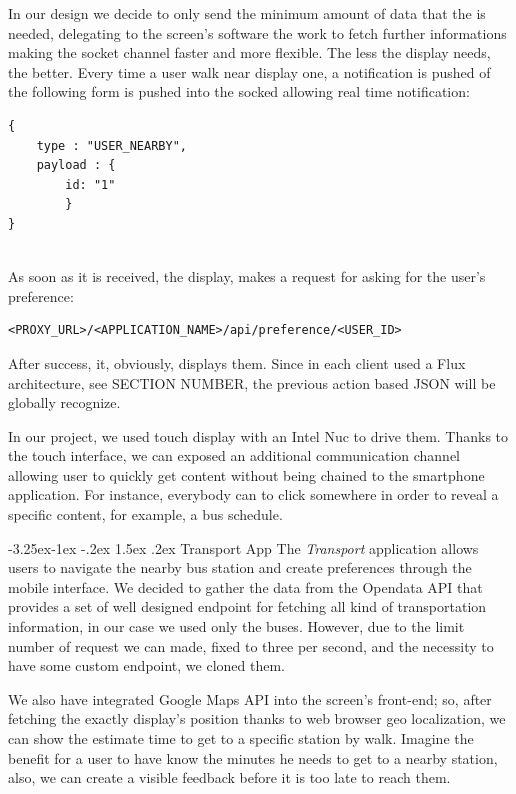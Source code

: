 \documentclass[]{usiinfbachelorproject}
\makeatletter
\newcommand\subsubsection{\@startsection{subsubsection}{3}{\z@}%
                {-3.25ex\@plus -1ex \@minus -.2ex}%
                {1.5ex \@plus .2ex}%
                {\normalfont\normalsize\bfseries}}
\makeatother
\begin{document}
In our design we decide to only send the minimum amount of data that the is needed, delegating to the screen's software the work to fetch further informations making the socket channel faster and more flexible. The less the display needs, the better. Every time a user walk near display one, a notification is pushed of the following form is pushed into the socked allowing real time notification:
\begin{lstlisting}
{
    type : "USER_NEARBY",
    payload : {
        id: "1"
        }
}
\end{lstlisting}
\\
As soon as it is received, the display, makes a request for asking for the user's preference:
\begin{lstlisting}
<PROXY_URL>/<APPLICATION_NAME>/api/preference/<USER_ID>
\end{lstlisting}
After success, it, obviously, displays them.
Since in each client used a Flux architecture, see SECTION NUMBER, the previous action based JSON will be globally recognize.

In our project, we used touch display with an Intel Nuc to drive them. Thanks to the touch interface, we can exposed an additional communication channel allowing user to quickly get content without being chained to the smartphone application. For instance, everybody can to click somewhere in order to reveal a specific content, for example, a bus schedule.

\subsubsection{Transport App}
The \emph{Transport} application allows users to navigate the nearby bus station and create preferences through the mobile interface. We decided to gather the data from the Opendata API that provides a set of well designed endpoint for fetching all kind of transportation information, in our case we used only the buses. However, due to the limit number of request we can made, fixed to three per second, and the necessity to have some custom endpoint, we cloned them.

We also have integrated Google Maps API into the screen's front-end; so, after fetching the exactly display's position thanks to web browser geo localization, we can show the estimate time to get to a specific station by walk. Imagine the benefit for a user to have know the minutes he needs to get to a nearby station, also, we can create a visible feedback before it is too late to reach them.
\end{document}
